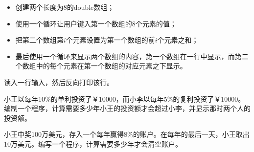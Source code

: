 \begin{frame}[fragile]
  \begin{biancheng}[13]
    \begin{itemize}
    \item 创建两个长度为8的double数组；\\[.1in]
    \item 使用一个循环让用户键入第一个数组的8个元素的值；\\[.1in]
    \item 把第二个数组第$i$个元素设置为第一个数组的前$i$个元素之和；\\[.1in]
    \item 最后使用一个循环来显示两个数组的内容，第一个数组在一行中显示，而第二个数组中的每个元素在第一个数组的对应元素之下显示。
  \end{itemize}
\end{biancheng}
\end{frame}

% 

\begin{frame}[fragile]
\begin{biancheng}[14]
读入一行输入，然后反向打印该行。
\end{biancheng}
\end{frame}

% 


\begin{frame}[fragile]
\begin{biancheng}[15]
小王以每年10\%的单利投资了￥10000，而小李以每年5\%的复利投资了￥10000。编制一个程序，计算需要多少年小王的投资额才会超过小李，并显示那时两个人的投资额。
\end{biancheng}
\end{frame}

% 


\begin{frame}[fragile]
\begin{biancheng}[16]
小王中奖100万美元，存入一个每年赢得8\%的账户。在每年的最后一天，小王取出10万美元。编写一个程序，计算需要多少年才会清空账户。
\end{biancheng}
\end{frame}


% 

